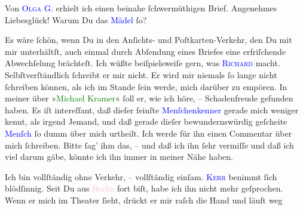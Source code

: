 \pstart
           Von \textsc{\textcolor{blue}{Olga G.}{}\ledrightnote{\textcolor{blue}{Olga Schnitzler}}} erhielt ich einen beinahe ſchwermüthigen Brief. Angenehmes Liebesglück! Warum
                  \label{K_L03055-3v}\label{K_L03055-3h} Du das \textcolor{blue}{Mädel}{}\ledrightnote{{$\rightarrow$}\textcolor{blue}{Olga Schnitzler}} ſo?\pend
           
\pstart
           Es wäre ſchön, wenn Du in den \strikeout{\textcolor{gray}{B}} Anſichts- und Poſtkarten-Verkehr, den Du mit mir unterhältſt, auch einmal
               durch Abſendung eines Briefes eine erfriſchende Abwechſelung brächteſt. Ich wüßte
               beiſpielsweiſe gern, was \textsc{\textcolor{blue}{Richard}{}\ledrightnote{\textcolor{blue}{Richard Beer-Hofmann}}} macht. Selbſtverſtändlich ſchreibt er mir nicht. Er wird mir niemals ſo lange
               nicht ſchreiben können, als {\pb}ich im Stande ſein
               werde, mich darüber zu empören. In meiner \label{K_L03055-4v}\label{K_L03055-4h} über »\textcolor{green}{Michael Kramer}{}\ledrightnote{\textcolor{green}{Michael Kramer. Drama}}« ſoll er, wie ich höre, –
               Schadenfreude gefunden haben. Es iſt intereſſant, daß dieſer feinſte \strikeout{\textcolor{gray}{×}\-\textcolor{gray}{×}\-\textcolor{gray}{×}\-\textcolor{gray}{×}\-\textcolor{gray}{×}}{ }\textcolor{blue}{Menſchenkenner}{}\ledrightnote{{$\rightarrow$}\textcolor{blue}{Richard Beer-Hofmann}} gerade mich
               weniger kennt, als irgend Jemand, und daß gerade dieſer bewundernswürdig geſcheite
                  \textcolor{blue}{Menſch}{}\ledrightnote{{$\rightarrow$}\textcolor{blue}{Richard Beer-Hofmann}} ſo dumm über mich
               urtheilt. Ich werde für ihn einen Commentar über mich ſchreiben. Bitte ſag’ ihm das,
               – und daß ich ihn ſehr vermiſſe und daß ich viel darum gäbe, könnte ich ihn immer in
               meiner Nähe haben.\pend
           
\pstart
           {\pb}Ich bin vollſtändig ohne Verkehr,
               – vollſtändig einſam. \textsc{\textcolor{blue}{Kerr}{}\ledrightnote{\textcolor{blue}{Alfred Kerr}}} benimmt ſich blödſinnig. Seit Du aus \textcolor{pink}{Berlin}{}\ledrightnote{\textcolor{pink}{Berlin}}
               fort biſt, habe ich ihn nicht mehr geſprochen. Wenn er mich im Theater ſieht, drückt
               er mir raſch die Hand und läuft weg{\dotssix}\pend
           
